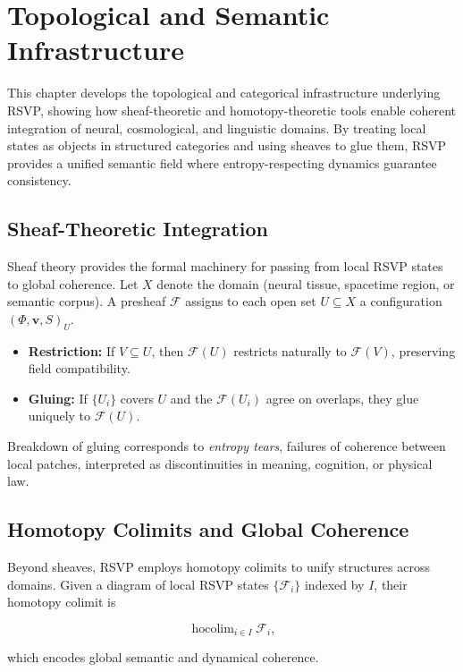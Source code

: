 \documentclass[a4paper,11pt,openany]{book}
\begin{document}
\chapter{Topological and Semantic Infrastructure}

This chapter develops the topological and categorical infrastructure underlying RSVP, 
showing how sheaf-theoretic and homotopy-theoretic tools enable coherent integration 
of neural, cosmological, and linguistic domains. By treating local states as objects 
in structured categories and using sheaves to glue them, RSVP provides a unified 
semantic field where entropy-respecting dynamics guarantee consistency.  

\section{Sheaf-Theoretic Integration}

Sheaf theory provides the formal machinery for passing from local RSVP states to 
global coherence. Let $X$ denote the domain (neural tissue, spacetime region, or 
semantic corpus). A presheaf $\mathcal{F}$ assigns to each open set $U \subseteq X$ 
a configuration $(\Phi, \mathbf{v}, S)_U$.  

\begin{itemize}
  \item \textbf{Restriction:} If $V \subseteq U$, then $\mathcal{F}(U)$ restricts 
  naturally to $\mathcal{F}(V)$, preserving field compatibility.  
  \item \textbf{Gluing:} If $\{U_i\}$ covers $U$ and the $\mathcal{F}(U_i)$ agree 
  on overlaps, they glue uniquely to $\mathcal{F}(U)$.  
\end{itemize}

Breakdown of gluing corresponds to \emph{entropy tears}, failures of coherence 
between local patches, interpreted as discontinuities in meaning, cognition, or 
physical law.  

\section{Homotopy Colimits and Global Coherence}

Beyond sheaves, RSVP employs homotopy colimits to unify structures across 
domains. Given a diagram of local RSVP states $\{\mathcal{F}_i\}$ indexed by $I$, 
their homotopy colimit is

\[
\operatorname{hocolim}_{i \in I} \mathcal{F}_i,
\]

which encodes global semantic and dynamical coherence.  
\end{document}
